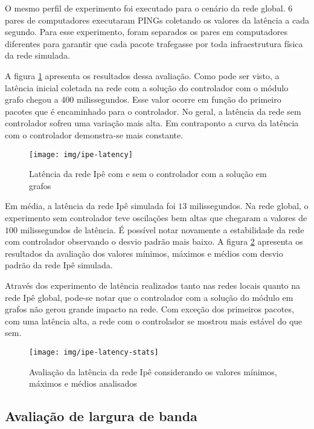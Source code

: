 O mesmo perfil de experimento foi executado para o cenário da rede global.
6 pares de computadores executaram PINGs coletando os valores da latência
a cada segundo.
Para esse experimento, foram separados os pares em computadores diferentes 
para garantir que cada pacote trafegasse por toda infraestrutura física da 
rede simulada. 

A figura \ref{fig:ipe-latency} apresenta os resultados dessa avaliação.
Como pode ser visto, a latência inicial coletada na rede com a solução do 
controlador com o módulo grafo chegou a 400 milissegundos.
Esse valor ocorre em função do primeiro pacotes que é encaminhado para o 
controlador.
No geral, a latência da rede sem controlador sofreu uma variação mais alta.
Em contraponto a curva da latência com o controlador demonstra-se mais 
constante.

\begin{figure}[!htb]
    \centering
    \label{fig:ipe-latency}
    \texttt{[image: img/ipe-latency]}
    \caption{Latência da rede Ipê com e sem o controlador com a solução em 
    grafos}
\end{figure}

Em média, a latência da rede Ipê simulada foi $13$ milissegundos.
Na rede global, o experimento sem controlador teve oscilações bem altas que
chegaram a valores de $100$ milissegundos de latência.
É possível notar novamente a estabilidade da rede com controlador observando
o desvio padrão mais baixo. 
A figura \ref{fig:ipe-latency-stats} apresenta os resultados da avaliação dos
valores mínimos, máximos e médios com desvio padrão da rede Ipê simulada.

Através dos experimento de latência realizados tanto nas redes locais quanto 
na rede Ipê global, pode-se notar que o controlador com a solução do módulo 
em grafos não gerou grande impacto na rede.
Com exceção dos primeiros pacotes, com uma latência alta, a rede com o 
controlador se mostrou mais estável do que sem. 

\begin{figure}[!htb]
    \centering
    \label{fig:ipe-latency-stats}
    \texttt{[image: img/ipe-latency-stats]}
    \caption{Avaliação da latência da rede Ipê considerando os valores mínimos,
    máximos e médios analisados}
\end{figure}

\subsection{Avaliação de largura de banda}

